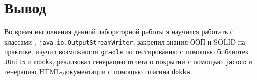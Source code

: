 \section{Вывод}
Во время выполнения данной лабораторной работы я научился работать с
классами \texttt{}, \texttt{java.io.OutputStreamWriter},
закрепил знания ООП и SOLID на практике, изучил возможности \texttt{gradle} по тестированию
с помощью библиотек \texttt{JUnit5} и \texttt{mockk}, реализовал генерацию отчета о покрытии 
с помощью \texttt{jacoco} и генерацию HTML-документации с помощью плагина \texttt{dokka}.